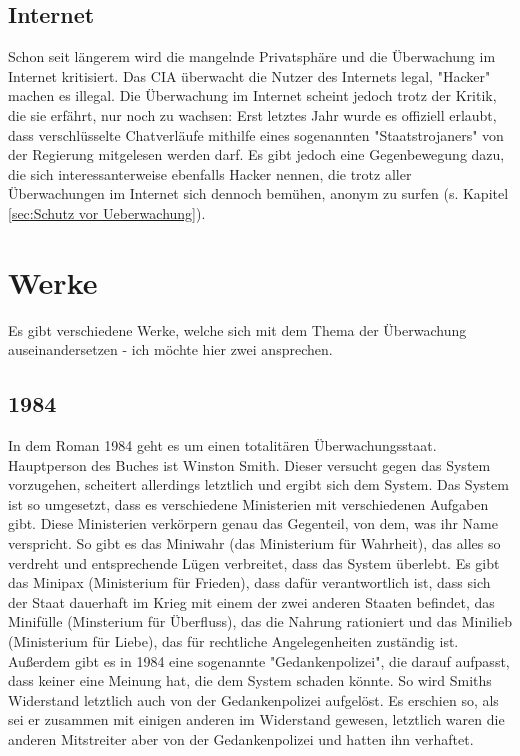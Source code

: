 \documentclass{article}
\begin{document}
\subsection{Internet\autocite{Internet}}
Schon seit längerem wird die mangelnde Privatsphäre und die Überwachung im Internet kritisiert. Das CIA überwacht die Nutzer des Internets legal, "Hacker" machen es illegal. Die Überwachung im Internet scheint jedoch trotz der Kritik, die sie erfährt, nur noch zu wachsen: Erst letztes Jahr wurde es offiziell erlaubt, dass verschlüsselte Chatverläufe mithilfe eines sogenannten "Staatstrojaners" von der Regierung mitgelesen werden darf. Es gibt jedoch eine Gegenbewegung dazu, die sich interessanterweise ebenfalls Hacker nennen, die trotz aller Überwachungen im Internet sich dennoch bemühen, anonym zu surfen (s. Kapitel \ref{sec:Schutz vor Ueberwachung}).

\section{Werke}
Es gibt verschiedene Werke, welche sich mit dem Thema der Überwachung auseinandersetzen - ich möchte hier zwei ansprechen.

\subsection{1984\autocite{1984}}
\label{subsec:1984}
In dem Roman 1984 geht es um einen totalitären Überwachungsstaat. Hauptperson des Buches ist Winston Smith. Dieser versucht gegen das System vorzugehen, scheitert allerdings letztlich und ergibt sich dem System.
Das System ist so umgesetzt, dass es verschiedene Ministerien mit verschiedenen Aufgaben gibt. Diese Ministerien verkörpern genau das Gegenteil, von dem, was ihr Name verspricht. So gibt es das Miniwahr (das Ministerium für Wahrheit), das alles so verdreht und entsprechende Lügen verbreitet, dass das System überlebt. Es gibt das Minipax (Ministerium für Frieden), dass dafür verantwortlich ist, dass sich der Staat dauerhaft im Krieg mit einem der zwei anderen Staaten befindet, das Minifülle (Minsterium für Überfluss), das die Nahrung rationiert und das Minilieb (Ministerium für Liebe), das für rechtliche Angelegenheiten zuständig ist. Außerdem gibt es in 1984 eine sogenannte "Gedankenpolizei", die darauf aufpasst, dass keiner eine Meinung hat, die dem System schaden könnte. So wird Smiths Widerstand letztlich auch von der Gedankenpolizei aufgelöst. Es erschien so, als sei er zusammen mit einigen anderen im Widerstand gewesen, letztlich waren die anderen Mitstreiter aber von der Gedankenpolizei und hatten ihn verhaftet.
\end{document}
